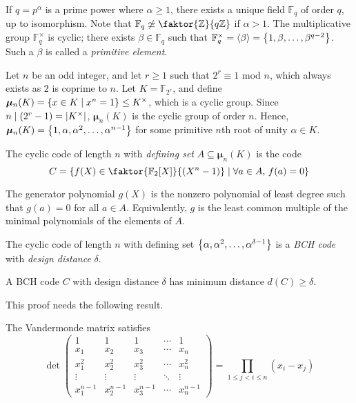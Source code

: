 If \( q = p^\alpha \) is a prime power where \( \alpha \geq 1 \), there exists a unique field \( \mathbb F_q \) of order \( q \), up to isomorphism.
Note that \( \mathbb F_q \not\simeq \faktor{\mathbb Z}{q\mathbb Z} \) if \( \alpha > 1 \).
The multiplicative group \( \mathbb F_q^\times \) is cyclic; there exists \( \beta \in \mathbb F_q \) such that \( \mathbb F_q^\times = \left\langle{} \beta \right\rangle = \qty{1, \beta, \dots, \beta^{q-2}} \).
Such a \( \beta \) is called a \emph{primitive element}.

Let \( n \) be an odd integer, and let \( r \geq 1 \) such that \( 2^r \equiv 1 \) mod \( n \), which always exists as \( 2 \) is coprime to \( n \).
Let \( K = \mathbb F_{2^r} \), and define \( \bm \mu_n(K) = \qty{x \in K \mid x^n = 1} \leq K^\times \), which is a cyclic group.
Since \( n \mid (2^r - 1) = \abs{K^\times} \), \( \bm \mu_n(K) \) is the cyclic group of order \( n \).
Hence, \( \bm \mu_n(K) = \qty{1, \alpha, \alpha^2, \dots, \alpha^{n-1}} \) for some primitive \( n \)th root of unity \( \alpha \in K \).
\begin{definition}
    The cyclic code of length \( n \) with \emph{defining set} \( A \subseteq \bm\mu_n(K) \) is the code
    \[ C = \qty{f(X) \in \faktor{\mathbb F_2[X]}{(X^n - 1)} \mid \forall a \in A,\, f(a) = 0} \]
\end{definition}
The generator polynomial \( g(X) \) is the nonzero polynomial of least degree such that \( g(a) = 0 \) for all \( a \in A \).
Equivalently, \( g \) is the least common multiple of the minimal polynomials of the elements of \( A \).
\begin{definition}
    The cyclic code of length \( n \) with defining set \( \qty{\alpha, \alpha^2, \dots, \alpha^{\delta - 1}} \) is a \emph{BCH code} with \emph{design distance} \( \delta \).
\end{definition}
\begin{theorem}
    A BCH code \( C \) with design distance \( \delta \) has minimum distance \( d(C) \geq \delta \).
\end{theorem}
This proof needs the following result.
\begin{lemma}
    The Vandermonde matrix satisfies
    \[ \det \begin{pmatrix}
        1 & 1 & 1 & \cdots & 1 \\
        x_1 & x_2 & x_3 & \cdots & x_n \\
        x_1^2 & x_2^2 & x_3^2 & \cdots & x_n^2 \\
        \vdots & \vdots & \vdots & \ddots & \vdots \\
        x_1^{n-1} & x_2^{n-1} & x_3^{n-1} & \cdots & x_n^{n-1}
    \end{pmatrix} = \prod_{1 \leq j < i \leq n} (x_i - x_j) \]
\end{lemma}
